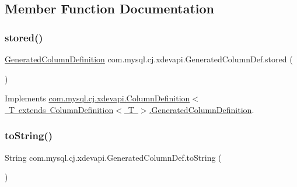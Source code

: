 \subsection{Member Function Documentation}
\mbox{\label{classcom_1_1mysql_1_1cj_1_1xdevapi_1_1_generated_column_def_a7518aecc43b11bfa3f23ada2721fd845}} 
\subsubsection{\texorpdfstring{stored()}{stored()}}
{\footnotesize\ttfamily \mbox{\hyperlink{interfacecom_1_1mysql_1_1cj_1_1xdevapi_1_1_column_definition_1_1_generated_column_definition}{Generated\+Column\+Definition}} com.\+mysql.\+cj.\+xdevapi.\+Generated\+Column\+Def.\+stored (\begin{DoxyParamCaption}{ }\end{DoxyParamCaption})}



Implements \mbox{\hyperlink{interfacecom_1_1mysql_1_1cj_1_1xdevapi_1_1_column_definition_1_1_generated_column_definition_a47428639edd0873f22e6e540a8a7d7d2}{com.\+mysql.\+cj.\+xdevapi.\+Column\+Definition$<$ T extends Column\+Definition$<$ T $>$.\+Generated\+Column\+Definition}}.

\mbox{\label{classcom_1_1mysql_1_1cj_1_1xdevapi_1_1_generated_column_def_a65933e6c35c706b35df70c6404f88e8a}} 
\subsubsection{\texorpdfstring{to\+String()}{toString()}}
{\footnotesize\ttfamily String com.\+mysql.\+cj.\+xdevapi.\+Generated\+Column\+Def.\+to\+String (\begin{DoxyParamCaption}{ }\end{DoxyParamCaption})}

